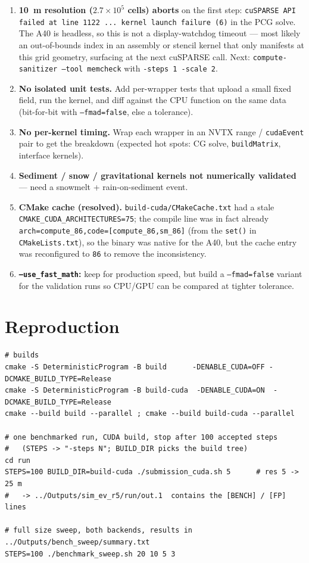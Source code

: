 \documentclass[11pt,a4paper]{article}
\begin{document}
\begin{enumerate}\setlength\itemsep{3pt}
\item \textbf{\SI{10}{m} resolution ($2.7\times10^{5}$ cells) aborts} on the
      first step:
      \texttt{cuSPARSE API failed at line 1122 ... kernel launch failure (6)}
      in the PCG solve. The A40 is headless, so this is not a display-watchdog
      timeout --- most likely an out-of-bounds index in an assembly or stencil
      kernel that only manifests at this grid geometry, surfacing at the next
      cuSPARSE call. Next: \texttt{compute-sanitizer --tool memcheck} with
      \texttt{-steps 1 -scale 2}.
\item \textbf{No isolated unit tests.} Add per-wrapper tests that upload a small
      fixed field, run the kernel, and diff against the CPU function on the same
      data (bit-for-bit with \texttt{--fmad=false}, else a tolerance).
\item \textbf{No per-kernel timing.} Wrap each wrapper in an NVTX range /
      \texttt{cudaEvent} pair to get the breakdown (expected hot spots: CG
      solve, \texttt{buildMatrix}, interface kernels).
\item \textbf{Sediment / snow / gravitational kernels not numerically
      validated} --- need a snowmelt + rain-on-sediment event.
\item \textbf{CMake cache (resolved).} \texttt{build-cuda/CMakeCache.txt} had a
      stale \texttt{CMAKE\_CUDA\_ARCHITECTURES=75}; the compile line was in fact
      already \texttt{arch=compute\_86,code=[compute\_86,sm\_86]} (from the
      \texttt{set()} in \texttt{CMakeLists.txt}), so the binary was native for
      the A40, but the cache entry was reconfigured to \texttt{86} to remove the
      inconsistency.
\item \textbf{\texttt{--use\_fast\_math}:} keep for production speed, but build
      a \texttt{--fmad=false} variant for the validation runs so CPU/GPU can be
      compared at tighter tolerance.
\end{enumerate}

\section{Reproduction}

\begin{Verbatim}[fontsize=\small,xleftmargin=1em,breaklines=true,breakanywhere=true]
# builds
cmake -S DeterministicProgram -B build      -DENABLE_CUDA=OFF -DCMAKE_BUILD_TYPE=Release
cmake -S DeterministicProgram -B build-cuda  -DENABLE_CUDA=ON  -DCMAKE_BUILD_TYPE=Release
cmake --build build --parallel ; cmake --build build-cuda --parallel

# one benchmarked run, CUDA build, stop after 100 accepted steps
#   (STEPS -> "-steps N"; BUILD_DIR picks the build tree)
cd run
STEPS=100 BUILD_DIR=build-cuda ./submission_cuda.sh 5      # res 5 -> 25 m
#   -> ../Outputs/sim_ev_r5/run/out.1  contains the [BENCH] / [FP] lines

# full size sweep, both backends, results in ../Outputs/bench_sweep/summary.txt
STEPS=100 ./benchmark_sweep.sh 20 10 5 3
\end{Verbatim}
\end{document}
